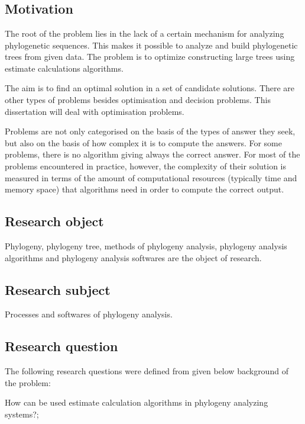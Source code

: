 \section*{}
\subsection*{Motivation}
The root of the problem lies in the lack of a certain mechanism 
for analyzing phylogenetic sequences. This makes it possible to 
analyze and build phylogenetic trees from given data. The problem 
is to optimize constructing large trees using estimate 
calculations algorithms.

The aim is to find an optimal solution in a set of candidate solutions. 
There are other types of problems besides optimisation and decision problems. 
This dissertation will deal with optimisation problems.

Problems are not only categorised on the basis of the types of 
answer they seek, but also on the basis of how complex it is to 
compute the answers. For some problems, there is no algorithm 
giving always the correct answer. For most of the problems 
encountered in practice, however, the complexity of their 
solution is measured in terms of the amount of computational 
resources (typically time and memory space) that algorithms need 
in order to compute the correct output.

\subsection*{Research object}
Phylogeny, phylogeny tree, methods of phylogeny analysis,
phylogeny analysis algorithms and phylogeny analysis
softwares are the object of research. 

\subsection*{Research subject}
Processes and softwares of phylogeny analysis.

\subsection*{Research question} 

The following research questions were defined from given below 
background of the problem:

How can be used estimate calculation algorithms in phylogeny 
analyzing systems?;

